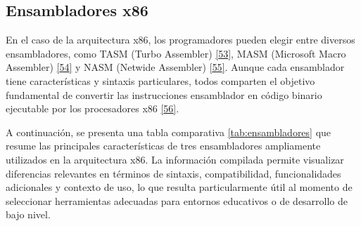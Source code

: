 \documentclass[12pt,oneside]{templates/unerthesis}
\begin{document}
\hypertarget{ensambladores-x86}{%
\subsection{Ensambladores x86}\label{ensambladores-x86}}

En el caso de la arquitectura x86, los programadores pueden elegir entre diversos ensambladores, como TASM (Turbo Assembler) \protect\hyperlink{ref-tasm}{{[}53{]}}, MASM (Microsoft Macro Assembler) \protect\hyperlink{ref-masm}{{[}54{]}} y NASM (Netwide Assembler) \protect\hyperlink{ref-nasm}{{[}55{]}}. Aunque cada ensamblador tiene características y sintaxis particulares, todos comparten el objetivo fundamental de convertir las instrucciones ensamblador en código binario ejecutable por los procesadores x86 \protect\hyperlink{ref-hyde2010art}{{[}56{]}}.

A continuación, se presenta una tabla comparativa \ref{tab:ensambladores} que resume las principales características de tres ensambladores ampliamente utilizados en la arquitectura x86. La información compilada permite visualizar diferencias relevantes en términos de sintaxis, compatibilidad, funcionalidades adicionales y contexto de uso, lo que resulta particularmente útil al momento de seleccionar herramientas adecuadas para entornos educativos o de desarrollo de bajo nivel.
\end{document}
